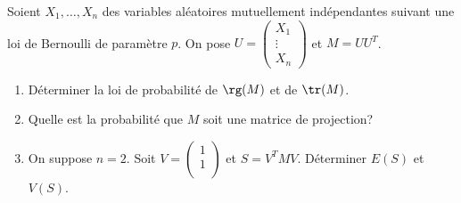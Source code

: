 \begin{enonce}
\begin{exercise}[ID={RMS126 E802},subtitle={Centrale PSI 2015},tags={}, difficulty={0}]
Soient $X_1,\dots,X_n$ des variables aléatoires mutuellement indépendantes suivant une loi de Bernoulli de paramètre $p$.
On pose $U= \begin{pmatrix} X_1\\ \vdots\\ X_n \end{pmatrix}$ et $M = U U^T$.
\begin{enumerate}
  \item Déterminer la loi de probabilité de $\rg(M)$ et de $\tr(M)$.

  \item Quelle est la probabilité que $M$ soit une matrice de projection?

  \item On suppose $n=2$.
    Soit $V= \begin{pmatrix} 1 \\ 1 \\ \end{pmatrix}$ et $S=V^T M V$.
    Déterminer $E(S)$ et $V(S)$.
\end{enumerate}
\end{exercise}
\begin{solution}
\end{solution}
\end{enonce}
